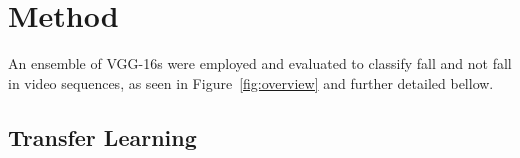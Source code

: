 \documentclass[conference]{IEEEtran}
\begin{document}



\section{Method}
\label{sec:method}

An ensemble of VGG-16s were employed and evaluated to classify fall and not fall in video sequences, as seen in Figure~\ref{fig:overview} and further detailed bellow.


\subsection{Transfer Learning}
\end{document}
